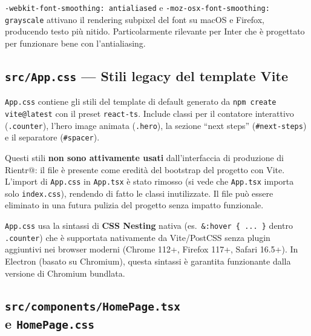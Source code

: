 \documentclass[a4paper,12pt]{article}
\renewcommand{\paragraph}[1]{%
  \par\vspace{4pt}%
  \noindent{\bfseries #1}\par\vspace{2pt}%
  \noindent\ignorespaces
}
\begin{document}
\paragraph{Font smoothing}
\texttt{-webkit-font-smoothing: antialiased} e
\texttt{-moz-osx-font-smoothing: grayscale} attivano il rendering
subpixel del font su macOS e Firefox, producendo testo pi\`{u}
nitido. Particolarmente rilevante per Inter che \`{e} progettato
per funzionare bene con l'antialiasing.

\subsection{\texttt{src/App.css} --- Stili legacy del template Vite}

\texttt{App.css} contiene gli stili del template di default generato
da \texttt{npm create vite@latest} con il preset
\texttt{react-ts}. Include classi per il contatore interattivo
(\texttt{.counter}), l'hero image animata (\texttt{.hero}),
la sezione ``next steps'' (\texttt{\#next-steps}) e il separatore
(\texttt{\#spacer}).

Questi stili \textbf{non sono attivamente usati} dall'interfaccia
di produzione di Rientr@: il file \`{e} presente come eredit\`{a}
del bootstrap del progetto con Vite. L'import di \texttt{App.css}
in \texttt{App.tsx} \`{e} stato rimosso (si vede che \texttt{App.tsx}
importa solo \texttt{index.css}), rendendo di fatto le classi
inutilizzate. Il file pu\`{o} essere eliminato in una futura pulizia
del progetto senza impatto funzionale.

\begin{infobox}
\texttt{App.css} usa la sintassi di \textbf{CSS Nesting} nativa
(es.\ \texttt{\&:hover \{ ... \}} dentro \texttt{.counter}) che
\`{e} supportata nativamente da Vite/PostCSS senza plugin aggiuntivi
nei browser moderni (Chrome 112+, Firefox 117+, Safari 16.5+).
In Electron (basato su Chromium), questa sintassi \`{e} garantita
funzionante dalla versione di Chromium bundlata.
\end{infobox}


\subsection[\texttt{src/components/HomePage.tsx} e \texttt{HomePage.css}]{\texttt{src/components/HomePage.tsx}\\[2pt]e \texttt{HomePage.css}}
\end{document}
